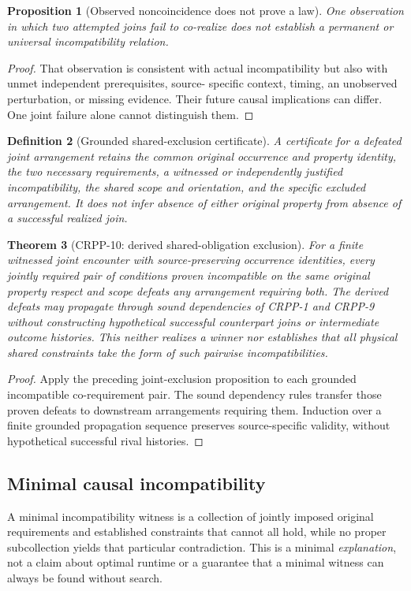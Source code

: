 \documentclass[11pt]{article}
\newtheorem{definition}{Definition}[section]
\newtheorem{proposition}[definition]{Proposition}
\newtheorem{theorem}[definition]{Theorem}
\begin{document}
\begin{proposition}[Observed noncoincidence does not prove a law]
One observation in which two attempted joins fail to
co-realize does not establish a permanent or universal
incompatibility relation.
\end{proposition}
\begin{proof}
That observation is consistent with actual incompatibility
but also with unmet independent prerequisites, source-
specific context, timing, an unobserved perturbation, or
missing evidence. Their future causal implications can
differ. One joint failure alone cannot distinguish them.
\end{proof}

\begin{definition}[Grounded shared-exclusion certificate]
A certificate for a defeated joint arrangement retains
the common original occurrence and property identity,
the two necessary requirements, a witnessed or independently
justified incompatibility, the shared scope and orientation,
and the specific excluded arrangement. It does not infer
absence of either original property from absence of a
successful realized join.
\end{definition}

\begin{theorem}[CRPP-10: derived shared-obligation exclusion]
For a finite witnessed joint encounter with source-preserving
occurrence identities, every jointly required pair of
conditions proven incompatible on the same original
property respect and scope defeats any arrangement requiring
both. The derived defeats may propagate through sound
dependencies of CRPP-1 and CRPP-9 without constructing
hypothetical successful counterpart joins or intermediate
outcome histories. This neither realizes a winner nor
establishes that all physical shared constraints take
the form of such pairwise incompatibilities.
\end{theorem}
\begin{proof}
Apply the preceding joint-exclusion proposition to
each grounded incompatible co-requirement pair.
The sound dependency rules transfer those proven
defeats to downstream arrangements requiring them.
Induction over a finite grounded propagation sequence
preserves source-specific validity, without hypothetical
successful rival histories.
\end{proof}

\subsection{Minimal causal incompatibility}
A minimal incompatibility witness is a collection of
jointly imposed original requirements and established
constraints that cannot all hold, while no proper
subcollection yields that particular contradiction.
This is a minimal \emph{explanation}, not a claim about
optimal runtime or a guarantee that a minimal witness
can always be found without search.
\end{document}

